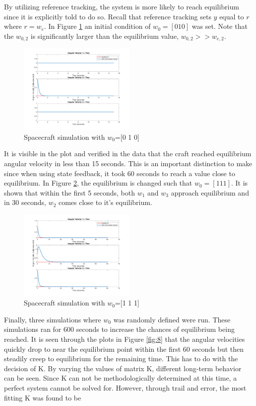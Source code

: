 \documentclass[12pt]{article}
\begin{document}
\\ \\ 
By utilizing reference tracking, the system is more likely to reach equilibrium since it is explicitly told to do so. Recall that reference tracking sets $y$ equal to $r$ where $r=w_{e}$. In Figure \ref{fig:6} an initial condition of $w_{0} = [0 1 0]$ was set. Note that the $w_{0,2}$ is significantly larger than the equilibrium value, $w_{0,2} >> w_{e,2}$.
\clearpage
\begin{figure}[h!]
\centering
\includegraphics[width=0.5\textwidth]{rt.pdf}
\caption{Spacecraft simulation with  $w_{0}$=[0 1 0]}
\label{fig:6}
\end{figure}
It is visible in the plot and verified in the data that the craft reached equilibrium angular velocity in less than 15 seconds. This is an important distinction to make since when using state feedback, it took 60 seconds to reach a value close to equilibrium. In Figure \ref{fig:7}, the equilibrium is changed such that $w_{0} = [1 1 1]$. It is shown that within the first 5 seconds, both $w_{1}$ and $w_{3}$ approach equilibrium and in 30 seconds, $w_{2}$ comes close to it's equilibrium. 
\begin{figure}[h!]
\centering
\includegraphics[width=0.5\textwidth]{rt1.pdf}
\caption{Spacecraft simulation with  $w_{0}$=[1 1 1]}
\label{fig:7}
\end{figure}
Finally, three simulations where $w_{0}$ was randomly defined were run. These simulations ran for 600 seconds to increase the chances of equilibrium being reached. It is seen through the plots in Figure \ref{fig:8} that the angular velocities quickly drop to near the equilibrium point within the first 60 seconds but then steadily creep to equilibrium for the remaining time. This has to do with the decision of K. By varying the values of matrix K, different long-term behavior can be seen. Since K can not be methodologically determined at this time, a perfect system cannot be solved for. However, through trail and error, the most fitting K was found to be 
\end{document}
